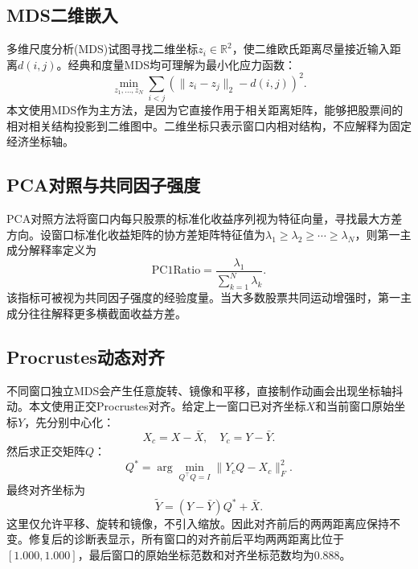 \documentclass[UTF8,zihao=-4]{ctexart}
\begin{document}
\subsection{MDS二维嵌入}
多维尺度分析(MDS)试图寻找二维坐标$z_i\in\mathbb{R}^2$，使二维欧氏距离尽量接近输入距离$d(i,j)$。经典和度量MDS均可理解为最小化应力函数\cite{Torgerson1952,Kruskal1964}：
\begin{equation}
\min_{z_1,\ldots,z_N}\sum_{i<j}\left(\lVert z_i-z_j\rVert_2-d(i,j)\right)^2.
\end{equation}
本文使用MDS作为主方法，是因为它直接作用于相关距离矩阵，能够把股票间的相对相关结构投影到二维图中。二维坐标只表示窗口内相对结构，不应解释为固定经济坐标轴。

\subsection{PCA对照与共同因子强度}
PCA对照方法将窗口内每只股票的标准化收益序列视为特征向量，寻找最大方差方向。设窗口标准化收益矩阵的协方差矩阵特征值为$\lambda_1\geq \lambda_2\geq \cdots \geq \lambda_N$，则第一主成分解释率定义为
\begin{equation}
\mathrm{PC1Ratio}=\frac{\lambda_1}{\sum_{k=1}^{N}\lambda_k}.
\end{equation}
该指标可被视为共同因子强度的经验度量。当大多数股票共同运动增强时，第一主成分往往解释更多横截面收益方差\cite{Jolliffe2002}。

\subsection{Procrustes动态对齐}
不同窗口独立MDS会产生任意旋转、镜像和平移，直接制作动画会出现坐标轴抖动。本文使用正交Procrustes对齐\cite{Schonemann1966}。给定上一窗口已对齐坐标$X$和当前窗口原始坐标$Y$，先分别中心化：
\begin{equation}
X_c=X-\bar{X},\quad Y_c=Y-\bar{Y}.
\end{equation}
然后求正交矩阵$Q$：
\begin{equation}
Q^*=\arg\min_{Q^\top Q=I}\lVert Y_cQ-X_c\rVert_F^2.
\end{equation}
最终对齐坐标为
\begin{equation}
\tilde{Y}=(Y-\bar{Y})Q^*+\bar{X}.
\end{equation}
这里仅允许平移、旋转和镜像，不引入缩放。因此对齐前后的两两距离应保持不变。修复后的诊断表显示，所有窗口的对齐前后平均两两距离比位于$[1.000,1.000]$，最后窗口的原始坐标范数和对齐坐标范数均为0.888。
\end{document}

